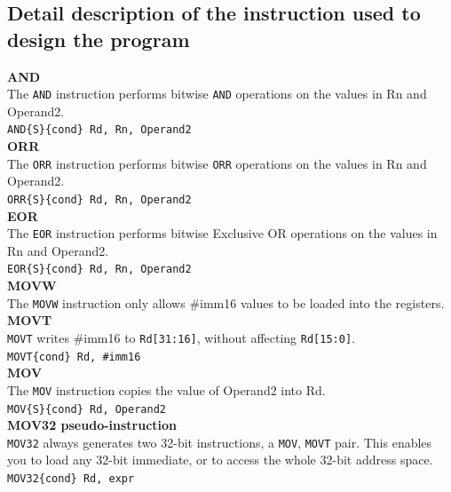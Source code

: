 \documentclass[footheight=20pt, footsepline, headheight=20pt, headsepline]{scrartcl}
\begin{document}
\subsection*{Detail description of the instruction used to design the program}
\textbf{AND}\\The \verb|AND| instruction performs bitwise \verb|AND| operations on the values in Rn and Operand2.\\
\verb|AND{S}{cond} Rd, Rn, Operand2|\\
\textbf{ORR}\\The \verb|ORR| instruction performs bitwise \verb|ORR| operations on the values in Rn and Operand2.\\
\verb|ORR{S}{cond} Rd, Rn, Operand2|\\
\textbf{EOR}\\The \verb|EOR| instruction performs bitwise Exclusive OR operations on the values in Rn and Operand2.\\
\verb|EOR{S}{cond} Rd, Rn, Operand2|\\
\textbf{MOVW}\\The \verb|MOVW| instruction only allows \#imm16 values to be loaded into the registers.\\
\textbf{MOVT}\\\verb|MOVT| writes \#imm16 to \verb|Rd[31:16]|, without affecting \verb|Rd[15:0]|.\\
\verb|MOVT{cond} Rd, #imm16|\\
\textbf{MOV}\\
The \verb|MOV| instruction copies the value of Operand2 into Rd.\\
\verb|MOV{S}{cond} Rd, Operand2|\\
\textbf{MOV32 pseudo-instruction}\\
\verb|MOV32| always generates two 32-bit instructions, a \verb|MOV|, \verb|MOVT| pair. This enables you to load any 32-bit immediate, or to access the whole 32-bit address space.\\
\verb|MOV32{cond} Rd, expr|

\FloatBarrier
\end{document}
